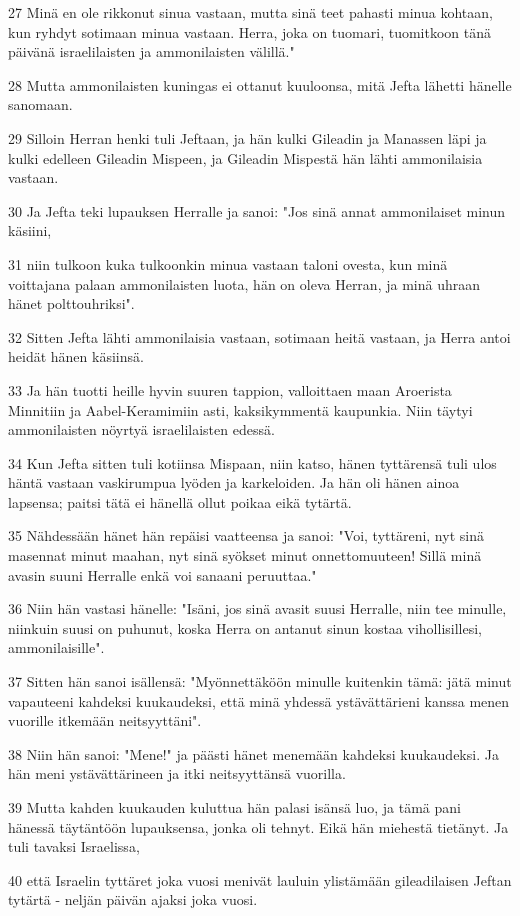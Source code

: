 \par 27 Minä en ole rikkonut sinua vastaan, mutta sinä teet pahasti minua kohtaan, kun ryhdyt sotimaan minua vastaan. Herra, joka on tuomari, tuomitkoon tänä päivänä israelilaisten ja ammonilaisten välillä."
\par 28 Mutta ammonilaisten kuningas ei ottanut kuuloonsa, mitä Jefta lähetti hänelle sanomaan.
\par 29 Silloin Herran henki tuli Jeftaan, ja hän kulki Gileadin ja Manassen läpi ja kulki edelleen Gileadin Mispeen, ja Gileadin Mispestä hän lähti ammonilaisia vastaan.
\par 30 Ja Jefta teki lupauksen Herralle ja sanoi: "Jos sinä annat ammonilaiset minun käsiini,
\par 31 niin tulkoon kuka tulkoonkin minua vastaan taloni ovesta, kun minä voittajana palaan ammonilaisten luota, hän on oleva Herran, ja minä uhraan hänet polttouhriksi".
\par 32 Sitten Jefta lähti ammonilaisia vastaan, sotimaan heitä vastaan, ja Herra antoi heidät hänen käsiinsä.
\par 33 Ja hän tuotti heille hyvin suuren tappion, valloittaen maan Aroerista Minnitiin ja Aabel-Keramimiin asti, kaksikymmentä kaupunkia. Niin täytyi ammonilaisten nöyrtyä israelilaisten edessä.
\par 34 Kun Jefta sitten tuli kotiinsa Mispaan, niin katso, hänen tyttärensä tuli ulos häntä vastaan vaskirumpua lyöden ja karkeloiden. Ja hän oli hänen ainoa lapsensa; paitsi tätä ei hänellä ollut poikaa eikä tytärtä.
\par 35 Nähdessään hänet hän repäisi vaatteensa ja sanoi: "Voi, tyttäreni, nyt sinä masennat minut maahan, nyt sinä syökset minut onnettomuuteen! Sillä minä avasin suuni Herralle enkä voi sanaani peruuttaa."
\par 36 Niin hän vastasi hänelle: "Isäni, jos sinä avasit suusi Herralle, niin tee minulle, niinkuin suusi on puhunut, koska Herra on antanut sinun kostaa vihollisillesi, ammonilaisille".
\par 37 Sitten hän sanoi isällensä: "Myönnettäköön minulle kuitenkin tämä: jätä minut vapauteeni kahdeksi kuukaudeksi, että minä yhdessä ystävättärieni kanssa menen vuorille itkemään neitsyyttäni".
\par 38 Niin hän sanoi: "Mene!" ja päästi hänet menemään kahdeksi kuukaudeksi. Ja hän meni ystävättärineen ja itki neitsyyttänsä vuorilla.
\par 39 Mutta kahden kuukauden kuluttua hän palasi isänsä luo, ja tämä pani hänessä täytäntöön lupauksensa, jonka oli tehnyt. Eikä hän miehestä tietänyt. Ja tuli tavaksi Israelissa,
\par 40 että Israelin tyttäret joka vuosi menivät lauluin ylistämään gileadilaisen Jeftan tytärtä - neljän päivän ajaksi joka vuosi.

